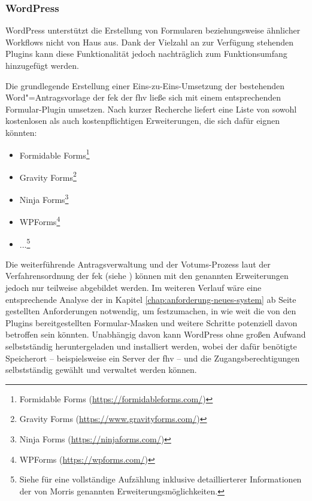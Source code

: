 \documentclass[a4paper,12pt,twoside,numbers=noendperiod]{scrreprt}
\begin{document}
\subsubsection*{WordPress}
\label{sub-sub-sec:wordpress}

WordPress unterstützt die Erstellung von Formularen beziehungsweise ähnlicher Workflows nicht von Haus aus. Dank der Vielzahl an zur Verfügung stehenden Plugins kann diese Funktionalität jedoch nachträglich zum Funktionsumfang hinzugefügt werden.

Die grundlegende Erstellung einer Eins-zu-Eins-Umsetzung der bestehenden Word"=Antragsvorlage der \ac{fek} der \ac{fhv} ließe sich mit einem entsprechenden Formular-Plugin umsetzen. Nach kurzer Recherche liefert \cite{morris_8_2023} eine Liste von sowohl kostenlosen als auch kostenpflichtigen Erweiterungen, die sich dafür eignen könnten:
\begin{itemize}
    \item Formidable Forms\footnote{Formidable Forms (\url{https://formidableforms.com/})}
    \item Gravity Forms\footnote{Gravity Forms (\url{https://www.gravityforms.com/})}
    \item Ninja Forms\footnote{Ninja Forms (\url{https://ninjaforms.com/})}
    \item WPForms\footnote{WPForms (\url{https://wpforms.com/})}
    \item ...\footnote{Siehe \cite{morris_8_2023} für eine vollständige Aufzählung inklusive detaillierterer Informationen der von Morris genannten Erweiterungsmöglichkeiten.}
\end{itemize}

Die weiterführende Antragsverwaltung und der Votums-Prozess laut der Verfahrensordnung der \ac{fek} (siehe \cite{forschungsethik-kommission_der_fachhochschule_vorarlberg_verfahrensordnung_2020}) können mit den genannten Erweiterungen jedoch nur teilweise abgebildet werden. Im weiteren Verlauf wäre eine entsprechende Analyse der in Kapitel \ref{chap:anforderung-neues-system} ab Seite \pageref{chap:anforderung-neues-system} gestellten Anforderungen notwendig, um festzumachen, in wie weit die von den Plugins bereitgestellten Formular-Masken und weitere Schritte potenziell davon betroffen sein könnten. Unabhängig davon kann WordPress ohne großen Aufwand selbstständig heruntergeladen und installiert werden, wobei der dafür benötigte Speicherort -- beispielsweise ein Server der \acl{fhv} -- und die Zugangsberechtigungen selbstständig gewählt und verwaltet werden können.
\end{document}
